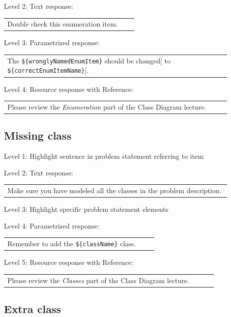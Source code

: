 \noindent Level 2: Text response: \medskip

\begin{tabular}{|p{0.9\linewidth}}
Double check this enumeration item.
\end{tabular} \medskip

\noindent Level 3: Parametrized response: \medskip

\begin{tabular}{|p{0.9\linewidth}}
The \verb|${wronglyNamedEnumItem}| should be changed[ to \verb|${correctEnumItemName}|].
\end{tabular} \medskip

\noindent Level 4: Resource response with Reference: \medskip

\begin{tabular}{|p{0.9\linewidth}}
Please review the \textit{Enumeration} part of the Class Diagram lecture.
\end{tabular} \medskip


\subsection{Missing class}

\noindent Level 1: Highlight sentence in problem statement referring to item \medskip

\noindent Level 2: Text response: \medskip

\begin{tabular}{|p{0.9\linewidth}}
Make sure you have modeled all the classes in the problem description.
\end{tabular} \medskip

\noindent Level 3: Highlight specific problem statement elements \medskip

\noindent Level 4: Parametrized response: \medskip

\begin{tabular}{|p{0.9\linewidth}}
Remember to add the \verb|${className}| class.
\end{tabular} \medskip

\noindent Level 5: Resource response with Reference: \medskip

\begin{tabular}{|p{0.9\linewidth}}
Please review the \textit{Classes} part of the Class Diagram lecture.
\end{tabular} \medskip


\subsection{Extra class}

